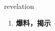 
\begin{frame}
{\huge revelation}
\begin{center}
\begin{enumerate}\Large
  \item \textbf{爆料，揭示}
\end{enumerate}
\end{center}
\end{frame}
